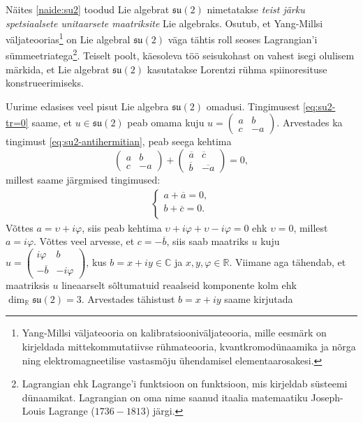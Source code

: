 \documentclass[a4paper,12pt]{article}
\theoremstyle{plain}
\theoremstyle{definition}
\numberwithin{equation}{section}
\def\R{{\mathbb R}}
\def\C{{\mathbb C}}
\def\su2{{\mathfrak{ su}\left(2\right)}}
\begin{document}
Näites \ref{naide:su2} toodud Lie algebrat $\su2$ nimetatakse \emph{teist järku spetsiaalsete unitaarsete maatriksite} Lie algebraks. Osutub, et Yang-Millsi väljateoorias\footnote{Yang-Millsi väljateooria on kalibratsiooniväljateooria, mille eesmärk on kirjeldada mittekommutatiivse rühmateooria, kvantkromodünaamika ja nõrga ning elektromagneetilise vastasmõju ühendamisel elementaarosakesi.} on Lie algebral $\su2$ väga tähtis roll seoses Lagrangian'i sümmeetriatega\footnote{Lagrangian ehk Lagrange'i funktsioon on funktsioon, mis kirjeldab süsteemi dünaamikat. Lagrangian on oma nime saanud itaalia matemaatiku Joseph-Louis Lagrange ($1736 - 1813$) järgi.}. Teiselt poolt, käesoleva töö seisukohast on vahest isegi olulisem märkida, et Lie algebrat $\su2$ kasutatakse Lorentzi rühma spiinoresituse konstrueerimiseks.

Uurime edasises veel pisut Lie algebra $\su2$ omadusi. Tingimusest \ref{eq:su2-tr=0} saame, et $u \in \su2$ peab omama kuju 
$u = \begin{pmatrix} a & b \\ c & -a\end{pmatrix}$. Arvestades ka tingimust \ref{eq:su2-antihermitian}, peab seega kehtima
\[\begin{pmatrix} a & b \\ c & -a\end{pmatrix} + \begin{pmatrix} \overline{a} & \overline{c} \\ \overline{b} & \overline{-a} \end{pmatrix} = 0,\]
millest saame järgmised tingimused:
\begin{align*}
\begin{cases}
    a + \overline{a} = 0, \\
    b + \overline{c} = 0. \\
  \end{cases}
\end{align*}
Võttes $a = \upsilon + i\varphi$, siis peab kehtima $\upsilon + i\varphi + \upsilon - i\varphi = 0$ ehk $\upsilon = 0$, millest $a = i\varphi$. Võttes veel arvesse, et $c = -\overline{b}$, siis saab maatriks $u$ kuju $u = \begin{pmatrix} i\varphi & b \\ -\overline{b} & -i\varphi \end{pmatrix}$, kus $b=x+iy \in \C$ ja $x, y, \varphi \in \R$. Viimane aga tähendab, et maatriksis $u$ lineaarselt sõltumatuid reaalseid komponente kolm ehk $\dim_{\R} \su2 = 3$. Arvestades tähistust $b = x + iy$ saame kirjutada
\end{document}
